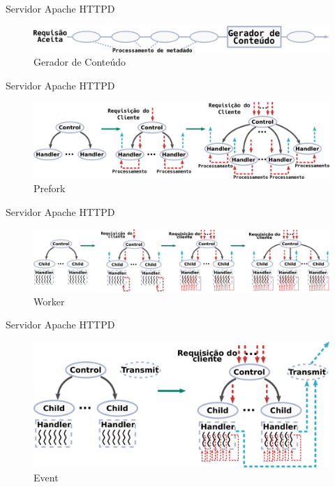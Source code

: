 \documentclass[xcolor={usenames,svgnames,dvipsnames},brazil,english,12pt,aspectratio=149]{beamer}
\begin{document}
\begin{frame}{Servidor Apache HTTPD}
	\begin{figure}[!h]
		\centering
		\includegraphics[width=.9\textwidth]{request_phases} 
		\caption{Gerador de Conteúdo}
		\label{fig:content_generator} 
	\end{figure}
\end{frame}

\begin{frame}{Servidor Apache HTTPD}
	\begin{figure}[!h]
		\centering
		\includegraphics[width=\textwidth]{prefork} 
		\caption{Prefork}
		\label{fig:prefork} 
	\end{figure}
\end{frame}

\begin{frame}{Servidor Apache HTTPD}
	\begin{figure}[!h]
		\centering
		\includegraphics[width=\textwidth]{worker} 
		\caption{Worker}
		\label{fig:worker} 
	\end{figure}
\end{frame}

\begin{frame}{Servidor Apache HTTPD}
	\begin{figure}[!h]
		\centering
		\includegraphics[width=.7\textwidth]{event} 
		\caption{Event}
		\label{fig:event} 
	\end{figure}
\end{frame}
\end{document}
